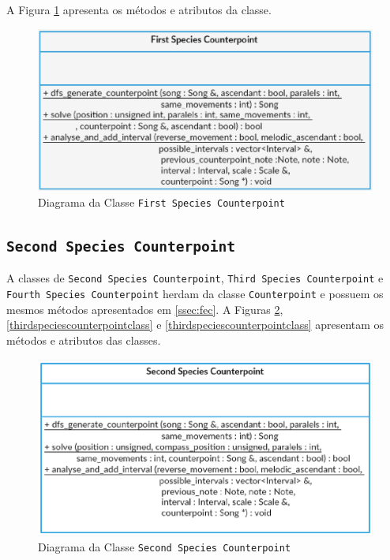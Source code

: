       A Figura \ref{firstspeciescounterpointclass} apresenta os métodos e atributos da classe.

      \begin{figure}[htb]
        \centering
        \includegraphics[scale=0.7]{figuras/firstspeciescounterpointclass.eps}
        \caption{Diagrama da Classe \texttt{First Species Counterpoint}}
        \label{firstspeciescounterpointclass}
      \end{figure}

    \subsection[\texttt{Second Species Counterpoint} a \texttt{Fourth Species Counterpoint}]{\texttt{Second Species Counterpoint}}

      A classes de \texttt{Second Species Counterpoint}, \texttt{Third Species Counterpoint} e \texttt{Fourth Species Counterpoint} herdam da classe \texttt{Counterpoint} e possuem os mesmos métodos apresentados em \ref{ssec:fec}. A Figuras \ref{secondspeciescounterpointclass}, \ref{thirdspeciescounterpointclass} e \ref{thirdspeciescounterpointclass} apresentam os métodos e atributos das classes.

      \begin{figure}[htb]
        \centering
        \includegraphics[scale=0.7]{figuras/secondspeciescounterpointclass.eps}
        \caption{Diagrama da Classe \texttt{Second Species Counterpoint}}
        \label{secondspeciescounterpointclass}
      \end{figure}

